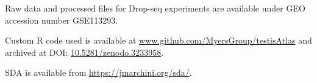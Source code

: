 Raw data and processed files for Drop-seq experiments are available under GEO accession number GSE113293.

Custom R code used is available at \url{www.github.com/MyersGroup/testisAtlas} and archived at DOI: \href{http://www.doi.org/10.5281/zenodo.3233958}{10.5281/zenodo.3233958}.

SDA is available from \url{https://jmarchini.org/sda/}.







